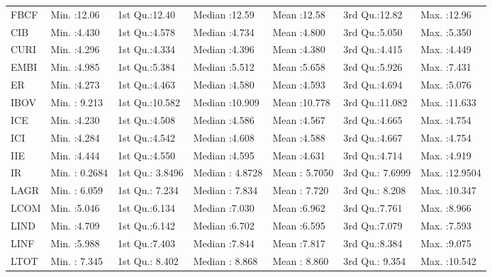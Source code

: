 \begin{table}[!htb]
\centering
\begin{tabular}{lllllll}
  \hline
  \hline
     FBCF & Min.   :12.06   & 1st Qu.:12.40   & Median :12.59   & Mean   :12.58   & 3rd Qu.:12.82   & Max.   :12.96   \\ 
       CIB & Min.   :4.430   & 1st Qu.:4.578   & Median :4.734   & Mean   :4.800   & 3rd Qu.:5.050   & Max.   :5.350   \\ 
       CURI & Min.   :4.296   & 1st Qu.:4.334   & Median :4.396   & Mean   :4.380   & 3rd Qu.:4.415   & Max.   :4.449   \\ 
       EMBI & Min.   :4.985   & 1st Qu.:5.384   & Median :5.512   & Mean   :5.658   & 3rd Qu.:5.926   & Max.   :7.431   \\ 
        ER & Min.   :4.273   & 1st Qu.:4.463   & Median :4.580   & Mean   :4.593   & 3rd Qu.:4.694   & Max.   :5.076   \\ 
       IBOV & Min.   : 9.213   & 1st Qu.:10.582   & Median :10.909   & Mean   :10.778   & 3rd Qu.:11.082   & Max.   :11.633   \\ 
       ICE & Min.   :4.230   & 1st Qu.:4.508   & Median :4.586   & Mean   :4.567   & 3rd Qu.:4.665   & Max.   :4.754   \\ 
       ICI & Min.   :4.284   & 1st Qu.:4.542   & Median :4.608   & Mean   :4.588   & 3rd Qu.:4.667   & Max.   :4.754   \\ 
       IIE & Min.   :4.444   & 1st Qu.:4.550   & Median :4.595   & Mean   :4.631   & 3rd Qu.:4.714   & Max.   :4.919   \\ 
        IR & Min.   : 0.2684   & 1st Qu.: 3.8496   & Median : 4.8728   & Mean   : 5.7050   & 3rd Qu.: 7.6999   & Max.   :12.9504   \\ 
       LAGR & Min.   : 6.059   & 1st Qu.: 7.234   & Median : 7.834   & Mean   : 7.720   & 3rd Qu.: 8.208   & Max.   :10.347   \\ 
       LCOM & Min.   :5.046   & 1st Qu.:6.134   & Median :7.030   & Mean   :6.962   & 3rd Qu.:7.761   & Max.   :8.966   \\ 
       LIND & Min.   :4.709   & 1st Qu.:6.142   & Median :6.702   & Mean   :6.595   & 3rd Qu.:7.079   & Max.   :7.593   \\ 
       LINF & Min.   :5.988   & 1st Qu.:7.403   & Median :7.844   & Mean   :7.817   & 3rd Qu.:8.384   & Max.   :9.075   \\ 
       LTOT & Min.   : 7.345   & 1st Qu.: 8.402   & Median : 8.868   & Mean   : 8.860   & 3rd Qu.: 9.354   & Max.   :10.542   \\ 

\end{tabular}
\end{table}
